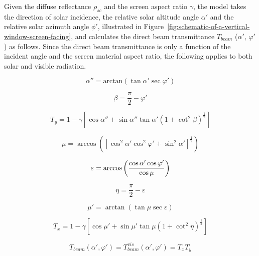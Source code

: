 Given the diffuse reflectance \(\rho_{sc}\) and the screen aspect ratio \(\gamma\), the model takes the direction of solar incidence, the relative solar altitude angle \(\alpha'\) and the relative solar azimuth angle \(\phi'\), illustrated in Figure~\ref{fig:schematic-of-a-vertical-window-screen-facing}, and calculates the direct beam transmittance \(T_{beam}\) (\(\alpha'\), \(\varphi'\)) as follows. Since the direct beam transmittance is only a function of the incident angle and the screen material aspect ratio, the following applies to both solar and visible radiation.

\begin{equation}
\alpha '' = {\mathrm{arctan}}\left( {\tan \alpha '\sec \varphi '} \right)
\end{equation}

\begin{equation}
\beta  = \frac{\pi }{2} - \varphi '
\end{equation}

\begin{equation}
{T_y} = 1 - \gamma \left[ {\cos \alpha '' + \sin \alpha ''\tan \alpha '{{\left( {1 + {{\cot }^2}\beta } \right)}^{\frac{1}{2}}}} \right]
\end{equation}

\begin{equation}
\mu  = \arccos \left( {{{\left[ {{{\cos }^2}\alpha '{{\cos }^2}\varphi ' + {{\sin }^2}\alpha '} \right]}^{\frac{1}{2}}}} \right)
\end{equation}

\begin{equation}
  \varepsilon  = \arccos \left(\frac{\cos \alpha '\cos \varphi '}{\cos \mu}\right)
\end{equation}

\begin{equation}
\eta  = \frac{\pi }{2} - \varepsilon
\end{equation}

\begin{equation}
\mu ' = \arctan \left( {\tan \mu \sec \varepsilon } \right)
\end{equation}

\begin{equation}
{T_x} = 1 - \gamma \left[ {\cos \mu ' + \sin \mu '\tan \mu {{\left( {1 + {{\cot }^2}\eta } \right)}^{\frac{1}{2}}}} \right]
\end{equation}

\begin{equation}
{T_{beam}}\left( {\alpha ',\varphi '} \right) = T_{beam}^{vis}\left( {\alpha ',\varphi '} \right) = {T_x}{T_y}
\end{equation}

